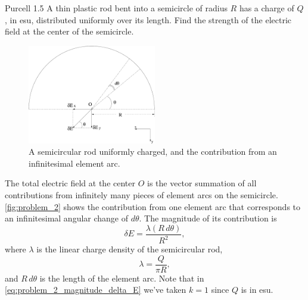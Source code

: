 \documentclass{esg8022pset}
\begin{document}
\begin{problem}{Purcell 1.5}
  A thin plastic rod bent into a semicircle of radius $R$ has a charge of $Q$, in esu, distributed uniformly over its length. Find the strength of the electric field at the center of the semicircle.
\end{problem}
\begin{solution}
  \begin{figure}[ht]
    \begin{center}\includegraphics[width=0.5\textwidth]{ps01_sol_02}\end{center}
    \caption{A semicircular rod uniformly charged, and the contribution from an infinitesimal element arc.}
    \label{fig:problem_2}
  \end{figure}
  
  The total electric field at the center $O$ is the vector summation of all contributions from infinitely many pieces of element arcs on the semicircle.  \autoref{fig:problem_2} shows the contribution from one element arc that corresponds to an infinitesimal angular change of $d\theta$. The magnitude of its contribution is
  \begin{equation}\label{eq:problem_2_magnitude_delta_E}
    \delta E = \frac{\lambda (R\,d\theta)}{R^2},
  \end{equation}
  where $\lambda$ is the linear charge density of the semicircular rod,
  \begin{equation*}\label{eq:problem_2:lambda}
    \lambda = \frac{Q}{\pi R},
  \end{equation*}
  and $R\,d\theta$ is the length of the element arc. Note that in \autoref{eq:problem_2_magnitude_delta_E} we've taken $k = 1$ since $Q$ is in esu.
  

\end{solution}
\end{document}

